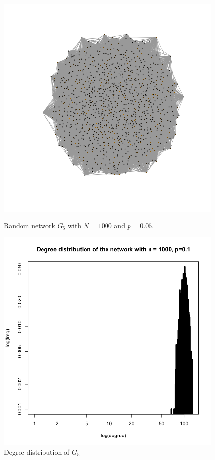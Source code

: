 \documentclass[draftcls,12pt,onecolumn]{IEEEtran}
\begin{document}
\begin{figure}[H]
\centering
\begin{minipage}[t]{0.48\textwidth}
\centering
\includegraphics[scale=0.2]{figures_part1_1/output_7_0.png}
\caption{Random network $G_5$ with $N=1000$ and $p=0.05$.}
\label{fig9}
\end{minipage}
\begin{minipage}[t]{0.48\textwidth}
\centering
\includegraphics[scale=0.2]{figures_part1_1/output_12_1.png}
\caption{Degree distribution of $G_5$}
\label{figten}
\end{minipage}
\end{figure}
\end{document}
